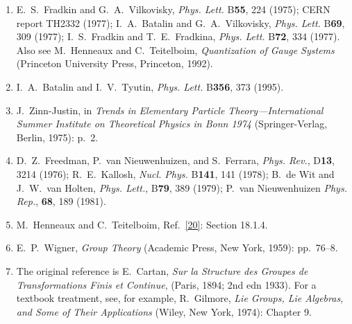 \begin{enumerate}
  \item {}\label{ch15-ref-20}
  E.~S.~Fradkin and G.~A.~Vilkovisky, \textit{Phys. Lett.} B\textbf{55}, 224 (1975); CERN report TH2332 (1977); I.~A.~Batalin and G.~A.~Vilkovisky, \textit{Phys. Lett.} B\textbf{69}, 309 (1977); I.~S.~Fradkin and T.~E.~Fradkina, \textit{Phys. Lett.} B\textbf{72}, 334 (1977). Also see M.~Henneaux and C.~Teitelboim, \textit{Quantization of Gauge Systems} (Princeton University Press, Princeton, 1992).

  \item {}\label{ch15-ref-21}
  I.~A.~Batalin and I.~V.~Tyutin, \textit{Phys. Lett.} B\textbf{356}, 373 (1995).

  \item {}\label{ch15-ref-22}
  J.~Zinn-Justin, in \textit{Trends in Elementary Particle Theory---International Summer Institute on Theoretical Physics in Bonn 1974} (Springer-Verlag, Berlin, 1975): p.~2.

  \item {}\label{ch15-ref-23}
  D.~Z.~Freedman, P.~van Nieuwenhuizen, and S.~Ferrara, \textit{Phys. Rev.}, D\textbf{13}, 3214 (1976); R.~E.~Kallosh, \textit{Nucl. Phys.} B\textbf{141}, 141 (1978); B.~de Wit and J.~W.~van Holten, \textit{Phys. Lett.}, B\textbf{79}, 389 (1979); P.~van Nieuwenhuizen \textit{Phys. Rep.}, \textbf{68}, 189 (1981).

  \item {}\label{ch15-ref-24}
  M.~Henneaux and C.~Teitelboim, Ref.~\hyperref[ch15-ref-20]{[20]}: Section 18.1.4.

  \item {}\label{ch15-ref-25}
  E.~P.~Wigner, \textit{Group Theory} (Academic Press, New York, 1959): pp.~76--8.

  \item {}\label{ch15-ref-26}
  The original reference is E.~Cartan, \textit{Sur la Structure des Groupes de Transformations Finis et Continue}, (Paris, 1894; 2nd edn 1933). For a textbook treatment, see, for example, R.~Gilmore, \textit{Lie Groups, Lie Algebras, and Some of Their Applications} (Wiley, New York, 1974): Chapter 9.
\end{enumerate}
